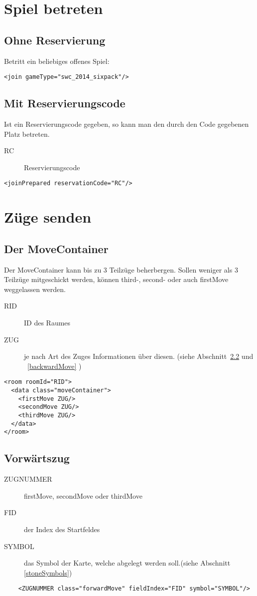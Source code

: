 \documentclass[12pt,a4paper, ngerman, oneside]{scrartcl}
\begin{document}
\section{Spiel betreten}
\subsection{Ohne Reservierung}
Betritt ein beliebiges offenes Spiel:
\begin{verbatim}
<join gameType="swc_2014_sixpack"/>
\end{verbatim}
\subsection{Mit Reservierungscode}
Ist ein Reservierungscode gegeben, so kann man den durch den Code gegebenen Platz betreten.
\begin{description}
\item[RC] Reservierungscode
\end{description}
\begin{verbatim}
<joinPrepared reservationCode="RC"/>
\end{verbatim}

\section{Züge senden}

\subsection{\label{moveContainer}Der MoveContainer}
Der MoveContainer kann bis zu 3 Teilzüge beherbergen. Sollen weniger als 3
Teilzüge mitgeschickt werden, können third-, second- oder auch firstMove
weggelassen werden.
\begin{description}
\item[RID] ID des Raumes
\item[ZUG] je nach Art des Zuges Informationen über diesen. (siehe
Abschnitt~\ref{forwardMove} und ~\ref{backwardMove} )
\end{description}
\begin{verbatim}
<room roomId="RID">
  <data class="moveContainer">
    <firstMove ZUG/>
    <secondMove ZUG/>
    <thirdMove ZUG/>
  </data>
</room>

\end{verbatim}
\subsection{Vorwärtszug}
\label{forwardMove}
\begin{description}
\item[ZUGNUMMER] firstMove, secondMove oder thirdMove
\item[FID] der Index des Startfeldes
\item[SYMBOL] das Symbol der Karte, welche abgelegt werden soll.(siehe
Abschnitt \ref{stoneSymbols})
\end{description}
\begin{verbatim}
	<ZUGNUMMER class="forwardMove" fieldIndex="FID" symbol="SYMBOL"/>
\end{verbatim}
\end{document}
